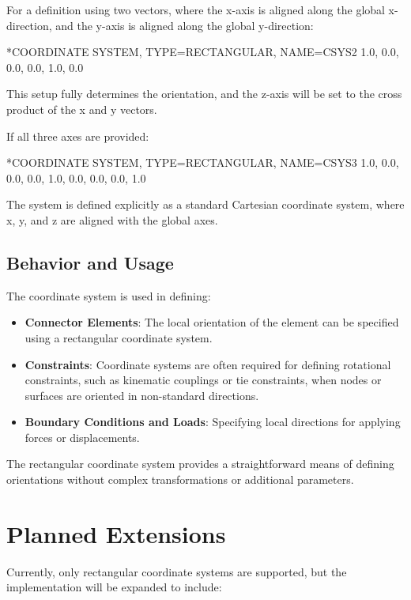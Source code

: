 For a definition using two vectors, where the x-axis is aligned along the global x-direction, and the y-axis is aligned along the global y-direction:

\begin{codeBlock}
*COORDINATE SYSTEM, TYPE=RECTANGULAR, NAME=CSYS2
1.0, 0.0, 0.0, 0.0, 1.0, 0.0
\end{codeBlock}

This setup fully determines the orientation, and the z-axis will be set to the cross product of the x and y vectors.

If all three axes are provided:

\begin{codeBlock}
*COORDINATE SYSTEM, TYPE=RECTANGULAR, NAME=CSYS3
1.0, 0.0, 0.0, 0.0, 1.0, 0.0, 0.0, 0.0, 1.0
\end{codeBlock}

The system is defined explicitly as a standard Cartesian coordinate system, where x, y, and z are aligned with the global axes.

\subsection{Behavior and Usage}

The coordinate system is used in defining:

\begin{itemize}
    \item \textbf{Connector Elements}: The local orientation of the element can be specified using a rectangular coordinate system.
    \item \textbf{Constraints}: Coordinate systems are often required for defining rotational constraints, such as kinematic couplings or tie constraints, when nodes or surfaces are oriented in non-standard directions.
    \item \textbf{Boundary Conditions and Loads}: Specifying local directions for applying forces or displacements.
\end{itemize}

The rectangular coordinate system provides a straightforward means of defining orientations without complex transformations or additional parameters.

\section{Planned Extensions}

Currently, only rectangular coordinate systems are supported, but the implementation will be expanded to include:

